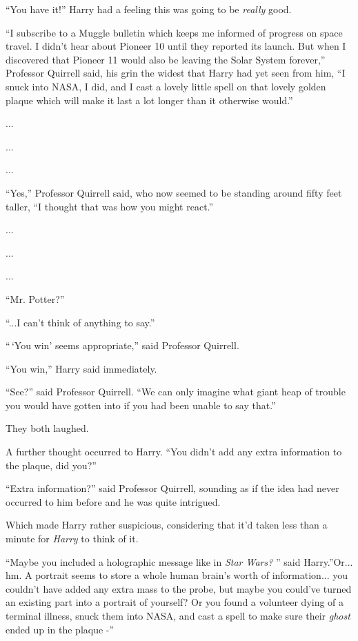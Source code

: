 ``You have it!'' Harry had a feeling this was going to be \emph{really}
good.

``I subscribe to a Muggle bulletin which keeps me informed of progress
on space travel. I didn't hear about Pioneer 10 until they reported its
launch. But when I discovered that Pioneer 11 would also be leaving the
Solar System forever,'' Professor Quirrell said, his grin the widest
that Harry had yet seen from him, ``I snuck into NASA, I did, and I cast
a lovely little spell on that lovely golden plaque which will make it
last a lot longer than it otherwise would.''

...

...

...

``Yes,'' Professor Quirrell said, who now seemed to be standing around
fifty feet taller, ``I thought that was how you might react.''

...

...

...

``Mr. Potter?''

``...I can't think of anything to say.''

``\,`You win' seems appropriate,'' said Professor Quirrell.

``You win,'' Harry said immediately.

``See?'' said Professor Quirrell. ``We can only imagine what giant heap
of trouble you would have gotten into if you had been unable to say
that.''

They both laughed.

A further thought occurred to Harry. ``You didn't add any extra
information to the plaque, did you?''

``Extra information?'' said Professor Quirrell, sounding as if the idea
had never occurred to him before and he was quite intrigued.

Which made Harry rather suspicious, considering that it'd taken less
than a minute for \emph{Harry} to think of it.

``Maybe you included a holographic message like in \emph{Star Wars?} ''
said Harry.''Or... hm. A portrait seems to store a whole human
brain's worth of information... you couldn't have added any extra
mass to the probe, but maybe you could've turned an existing part into a
portrait of yourself? Or you found a volunteer dying of a terminal
illness, snuck them into NASA, and cast a spell to make sure their
\emph{ghost} ended up in the plaque -''


